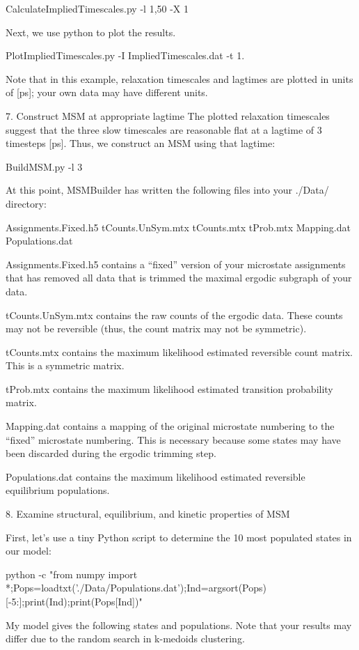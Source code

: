 \documentclass[12pt]{article}
\begin{document}
CalculateImpliedTimescales.py -l 1,50 -X 1

Next, we use python to plot the results.  

 PlotImpliedTimescales.py -I ImpliedTimescales.dat  -t 1. 


Note that in this example, relaxation timescales and lagtimes are plotted in units of [ps]; your own data may have different units.

7.   Construct MSM at appropriate lagtime
The plotted relaxation timescales suggest that the three slow timescales are reasonable flat at a lagtime of 3 timesteps [ps].  Thus, we construct an MSM using that lagtime:

BuildMSM.py -l 3

At this point, MSMBuilder has written the following files into your ./Data/ directory:

Assignments.Fixed.h5
tCounts.UnSym.mtx
tCounts.mtx
tProb.mtx
Mapping.dat
Populations.dat

Assignments.Fixed.h5 contains a “fixed” version of your microstate assignments that has removed all data that is trimmed the maximal ergodic subgraph of your data.  

tCounts.UnSym.mtx contains the raw counts of the ergodic data.  These counts may not be reversible (thus, the count matrix may not be symmetric).  

tCounts.mtx contains the maximum likelihood estimated reversible count matrix.  This is a symmetric matrix.  

tProb.mtx contains the maximum likelihood estimated transition probability matrix.  

Mapping.dat contains a mapping of the original microstate numbering to the “fixed” microstate numbering.  This is necessary because some states may have been discarded during the ergodic trimming step.  

Populations.dat contains the maximum likelihood estimated reversible equilibrium populations.  

8.  Examine structural, equilibrium, and kinetic properties of MSM

First, let’s use a tiny Python script to determine the 10 most populated states in our model:

python -c "from numpy import *;Pops=loadtxt('./Data/Populations.dat');Ind=argsort(Pops)[-5:];print(Ind);print(Pops[Ind])"

My model gives the following states and populations.  Note that your results may differ due to the random search in k-medoids clustering. 
\end{document}

